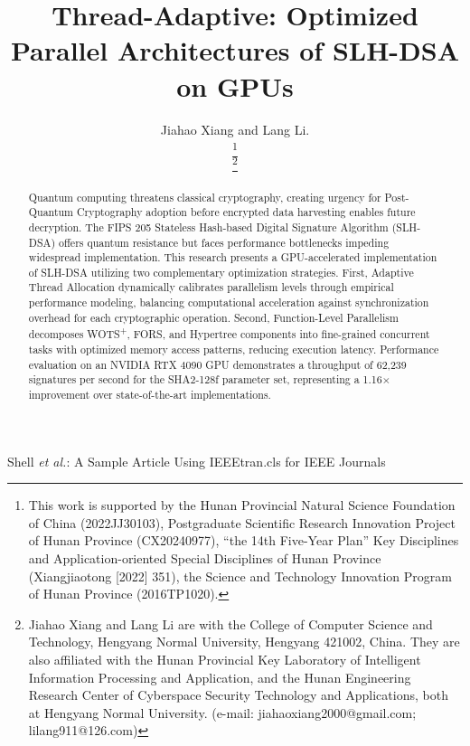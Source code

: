 \documentclass[journal]{IEEEtran}
\begin{document}
\title{Thread-Adaptive: Optimized Parallel Architectures of SLH-DSA on GPUs}

\author{Jiahao Xiang and Lang Li.

  \thanks{This work is supported by the Hunan Provincial Natural Science Foundation of China (2022JJ30103), Postgraduate Scientific Research Innovation Project of Hunan Province (CX20240977), “the 14th Five-Year Plan” Key Disciplines and Application-oriented Special Disciplines of Hunan Province (Xiangjiaotong [2022] 351), the Science and Technology Innovation Program of Hunan Province (2016TP1020).}

  \thanks{Jiahao Xiang and Lang Li are with the College of Computer Science and Technology, Hengyang Normal University, Hengyang 421002, China. They are also affiliated with the Hunan Provincial Key Laboratory of Intelligent Information Processing and Application, and the Hunan Engineering Research Center of Cyberspace Security Technology and Applications, both at Hengyang Normal University. (e-mail: jiahaoxiang2000@gmail.com; lilang911@126.com)}%
}

%
{Shell \MakeLowercase{\textit{et al.}}: A Sample Article Using IEEEtran.cls for IEEE Journals}

\IEEEpubid{}

\maketitle

\begin{abstract}
  Quantum computing threatens classical cryptography, creating urgency for Post-Quantum Cryptography adoption before encrypted data harvesting enables future decryption. 
  The FIPS 205 Stateless Hash-based Digital Signature Algorithm (SLH-DSA) offers quantum resistance but faces performance bottlenecks impeding widespread implementation.
  This research presents a GPU-accelerated implementation of SLH-DSA utilizing two complementary optimization strategies.
  First, Adaptive Thread Allocation dynamically calibrates parallelism levels through empirical performance modeling, balancing computational acceleration against synchronization overhead for each cryptographic operation.
  Second, Function-Level Parallelism decomposes WOTS\textsuperscript{+}, FORS, and Hypertree components into fine-grained concurrent tasks with optimized memory access patterns, reducing execution latency.
  Performance evaluation on an NVIDIA RTX 4090 GPU demonstrates a throughput of 62,239 signatures per second for the SHA2-128f parameter set, representing a 1.16$\times$ improvement over state-of-the-art implementations.
\end{abstract}
\end{document}
